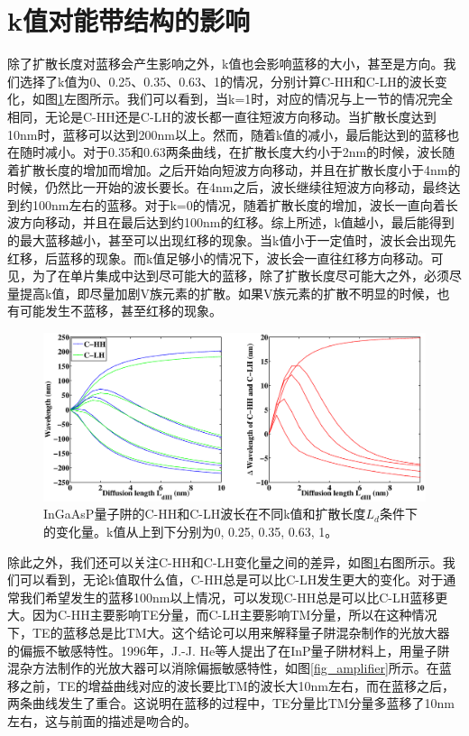 \documentclass{ZJUthesis}
\begin{document}
\section{k值对能带结构的影响}

除了扩散长度对蓝移会产生影响之外，k值也会影响蓝移的大小，甚至是方向。我们选择了k值为0、0.25、0.35、0.63、1的情况，分别计算C-HH和C-LH的波长变化，如图\ref{fig_k}左图所示。我们可以看到，当k=1时，对应的情况与上一节的情况完全相同，无论是C-HH还是C-LH的波长都一直往短波方向移动。当扩散长度达到10nm时，蓝移可以达到200nm以上。然而，随着k值的减小，最后能达到的蓝移也在随时减小。对于0.35和0.63两条曲线，在扩散长度大约小于2nm的时候，波长随着扩散长度的增加而增加。之后开始向短波方向移动，并且在扩散长度小于4nm的时候，仍然比一开始的波长要长。在4nm之后，波长继续往短波方向移动，最终达到约100nm左右的蓝移。对于k=0的情况，随着扩散长度的增加，波长一直向着长波方向移动，并且在最后达到约100nm的红移。综上所述，k值越小，最后能得到的最大蓝移越小，甚至可以出现红移的现象。当k值小于一定值时，波长会出现先红移，后蓝移的现象。而k值足够小的情况下，波长会一直往红移方向移动。可见，为了在单片集成中达到尽可能大的蓝移，除了扩散长度尽可能大之外，必须尽量提高k值，即尽量加剧V族元素的扩散。如果V族元素的扩散不明显的时候，也有可能发生不蓝移，甚至红移的现象。

\begin{figure}[!t]
    \centering
    \includegraphics[width=1.0\textwidth]{./Pictures/k.eps}
    \caption{InGaAsP量子阱的C-HH和C-LH波长在不同k值和扩散长度$L_d$条件下的变化量。k值从上到下分别为0, 0.25, 0.35, 0.63, 1。}
    \label{fig_k}
\end{figure}

除此之外，我们还可以关注C-HH和C-LH变化量之间的差异，如图\ref{fig_k}右图所示。我们可以看到，无论k值取什么值，C-HH总是可以比C-LH发生更大的变化。对于通常我们希望发生的蓝移100nm以上情况，可以发现C-HH总是可以比C-LH蓝移更大。因为C-HH主要影响TE分量，而C-LH主要影响TM分量，所以在这种情况下，TE的蓝移总是比TM大。这个结论可以用来解释量子阱混杂制作的光放大器的偏振不敏感特性。1996年，J.-J. He等人提出了在InP量子阱材料上，用量子阱混杂方法制作的光放大器可以消除偏振敏感特性\cite{He1996Polarization}，如图\ref{fig_amplifier}所示。在蓝移之前，TE的增益曲线对应的波长要比TM的波长大10nm左右，而在蓝移之后，两条曲线发生了重合。这说明在蓝移的过程中，TE分量比TM分量多蓝移了10nm左右，这与前面的描述是吻合的。
\end{document}

